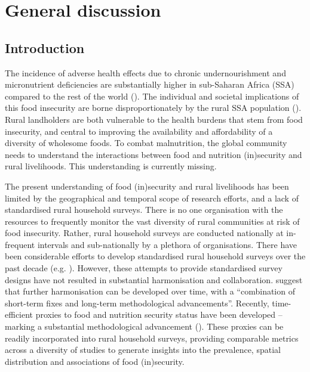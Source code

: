 \chapter[General discussion]{General discussion}
\label{cha:Chapter7}
\newpage

\section{Introduction}
The incidence of adverse health effects due to chronic undernourishment and micronutrient deficiencies are substantially higher in sub-Saharan Africa (SSA) compared to the rest of the world (\citealp{Godecke2018}). The individual and societal implications of this food insecurity are borne disproportionately by the rural SSA population (\citealp{Green2016}). Rural landholders are both vulnerable to the health burdens that stem from food insecurity, and central to improving the availability and affordability of a diversity of wholesome foods. To combat malnutrition, the global community needs to understand the interactions between food and nutrition (in)security and rural livelihoods. This understanding is currently missing.

The present understanding of food (in)security and rural livelihoods has been limited by the geographical and temporal scope of research efforts, and a lack of standardised rural household surveys. There is no one organisation with the resources to frequently monitor the vast diversity of rural communities at risk of food insecurity. Rather, rural household surveys are conducted nationally at in-frequent intervals and sub-nationally by a plethora of organisations. There have been considerable efforts to develop standardised rural household surveys over the past decade (e.g. \citealp{Carletto2009, Herrero2007}). However, these attempts to provide standardised survey designs have not resulted in substantial harmonisation and collaboration. \citet[p.~39]{Carletto2013} suggest that further harmonisation can be developed over time, with a ``combination of short-term fixes and long-term methodological advancements''. Recently, time-efficient proxies to food and nutrition security status have been developed -- marking a substantial methodological advancement (\citealp{Pisa2017, Keyzer2015}). These proxies can be readily incorporated into rural household surveys, providing comparable metrics across a diversity of studies to generate insights into the prevalence, spatial distribution and associations of food (in)security.

